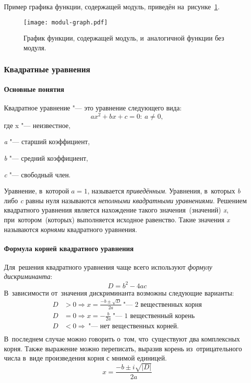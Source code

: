 \documentclass[]{scrartcl}
\begin{document}
Пример графика функции, содержащей модуль, приведён на~рисунке~\ref{fig:modul-graph}.

\begin{figure}[ht]
	\centering %
	\texttt{[image: modul-graph.pdf]}
	\caption{График функции, содержащей модуль, и~аналогичной функции без модуля.}\label{fig:modul-graph}
\end{figure}

\subsubsection{Квадратные уравнения}
\paragraph{Основные понятия}

Квадратное уравнение "--- это уравнение следующего вида:
\begin{equation}\label{eq:suare-eq}
ax^2+bx+c=0:\ a \neq 0,
\end{equation}
где x "--- неизвестное,

\textit{a} "--- старший коэффициент,

\textit {b} "--- средний коэффициент,

\textit{c} "--- свободный член.

Уравнение, в~которой $a=1$, называется \emph{приведённым}. Уравнения, в~которых \textit{b} либо \textit{c} равны нуля называются \emph{неполными квадратными уравнениями}.
Решением квадратного уравнения является нахождение такого значения~(значений) \textit{x}, при~котором~(которых) выполняется исходное равенство. Такие значения \textit{x} называются \emph{корнями} квадратного уравнения.

\paragraph{Формула корней квадратного уравнения}

Для~решения квадратного уравнения чаще всего используют \emph{формулу дискриминанта}:
\begin{equation}\label{Discriminant-1}
D=b^2-4ac
\end{equation}
В~зависимости от~значения дискриминанта возможны следующие варианты:
\begin{equation}\label{Discriminant-2}
\begin{aligned}
D&>0 \Rightarrow x=\frac{-b \pm \sqrt{D}}{2a}\  \text{"--- 2 вещественных корня}\\
D&=0 \Rightarrow x=-\frac{b}{2a}\  \text{"--- 1 вещественный корень}\\
D&<0 \Rightarrow\  \text{"--- нет вещественных корней}.\\
\end{aligned}
\end{equation}
В~последнем случае можно говорить о~том, что~существуют два комплексных корня. Также выражение можно переписать, выразив корень из~отрицательного числа в~виде произведения корня с мнимой единицей.
\begin{equation}\label{Discriminant-3}
x=\frac{-b \pm i\sqrt{|D|}}{2a}
\end{equation}
\end{document}
